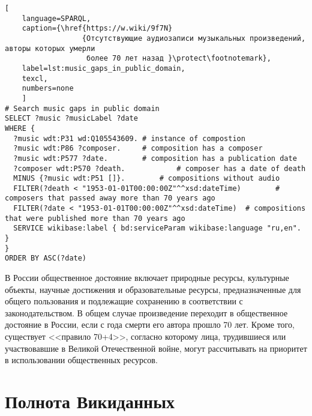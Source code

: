 \begin{lstlisting}[ 
    language=SPARQL,
    caption={\href{https://w.wiki/9f7N}
                  {Отсутствующие аудиозаписи музыкальных произведений, авторы которых умерли 
                   более 70 лет назад }\protect\footnotemark},
    label=lst:music_gaps_in_public_domain,
    texcl,
    numbers=none
    ]
# Search music gaps in public domain
SELECT ?music ?musicLabel ?date
WHERE {
  ?music wdt:P31 wd:Q105543609.	# instance of compostion
  ?music wdt:P86 ?composer.		# composition has a composer
  ?music wdt:P577 ?date.		# composition has a publication date
  ?composer wdt:P570 ?death.			# composer has a date of death
  MINUS {?music wdt:P51 []}.		# compositions without audio 
  FILTER(?death < "1953-01-01T00:00:00Z"^^xsd:dateTime)        # composers that passed away more than 70 years ago
  FILTER(?date < "1953-01-01T00:00:00Z"^^xsd:dateTime)  # compositions that were published more than 70 years ago
  SERVICE wikibase:label { bd:serviceParam wikibase:language "ru,en". }
}
ORDER BY ASC(?date)
\end{lstlisting}%


В России общественное достояние включает природные ресурсы, культурные объекты, научные достижения и образовательные ресурсы, предназначенные для общего пользования и подлежащие сохранению в соответствии с законодательством. В общем случае произведение переходит в общественное достояние в России, если с года смерти его автора прошло 70 лет. Кроме того, существует <<правило 70+4>>, согласно которому лица, трудившиеся или участвовавшие в Великой Отечественной войне, могут рассчитывать на приоритет в использовании общественных ресурсов.



\section{Полнота Викиданных}


